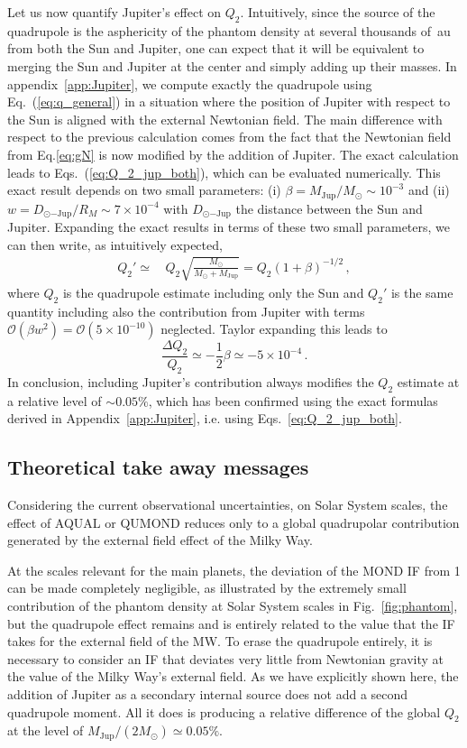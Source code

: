 \documentclass[reprint,nofootinbib,prd,aps]{revtex4-2}
\begin{document}
Let us now quantify Jupiter's effect on $Q_2$. Intuitively, since the source of the quadrupole is the asphericity of the phantom density at several thousands of~au from both the Sun and Jupiter, one can expect that it will be equivalent to merging the Sun and Jupiter at the center and simply adding up their masses. In appendix~\ref{app:Jupiter}, we compute exactly the quadrupole using Eq.~(\ref{eq:q_general}) in a situation where the position of Jupiter with respect to the Sun is aligned with the external Newtonian field. The main difference with respect to the previous calculation comes from the fact that the Newtonian field from Eq.\eqref{eq:gN} is now modified by the addition of Jupiter. The exact calculation leads to Eqs.~(\ref{eq:Q_2_jup_both}), which can be evaluated numerically. This exact result depends on two small parameters: (i) $\beta=M_\mathrm{Jup}/M_\odot\sim 10^{-3}$ and (ii) $w=D_{\odot\mathrm{-Jup}}/R_M\sim 7\times 10^{-4}$ with $D_{\odot\mathrm{-Jup}}$ the distance between the Sun and Jupiter. Expanding the exact results in terms of these two small parameters, we can then write, as intuitively expected,
\begin{align}
Q_2' \simeq
& \, Q_2 \sqrt{\frac{M_\odot}{M_\odot+M_\mathrm{Jup}}} \label{eq:delta_Q2} = Q_2 (1+ \beta)^{-1/2}\, ,
\end{align}
where $Q_2$ is the quadrupole estimate including only the Sun and $Q_2'$ is the same quantity including also the contribution from Jupiter with terms $\mathcal O(\beta w^2)=\mathcal O\left(5\times 10^{-10}\right)$ neglected. 
Taylor expanding this leads to  
\begin{equation}
    \frac{\Delta Q_2}{Q_2} \simeq -\frac{1}{2} \beta \simeq -5\times 10^{-4}\, .
\end{equation} 
In conclusion, including Jupiter's contribution always modifies the $Q_2$ estimate at a relative level of $\sim 0.05\%$, which has been confirmed using the exact formulas derived in Appendix~\ref{app:Jupiter}, i.e. using Eqs.~\eqref{eq:Q_2_jup_both}.


\subsection{Theoretical take away messages}
Considering the current observational uncertainties, on Solar System scales, the effect of AQUAL or QUMOND reduces only to a global quadrupolar contribution generated by the external field effect of the Milky Way. 

At the scales relevant for the main planets, the deviation of the MOND IF from 1 can be made completely negligible, as illustrated by the extremely small contribution of the phantom density at Solar System scales in Fig.~\ref{fig:phantom}, but the quadrupole effect remains and is entirely related to the value that the IF takes for the external field of the MW. To erase the quadrupole entirely, it is necessary to consider an IF that deviates very little from Newtonian gravity at the value of the Milky Way's external field. As we have explicitly shown here, the addition of Jupiter as a secondary internal source does not add a second quadrupole moment. All it does is producing a relative difference of the global $Q_2$ at the level of $M_\mathrm{Jup}/(2 M_\odot) \simeq 0.05\%$.
\end{document}
